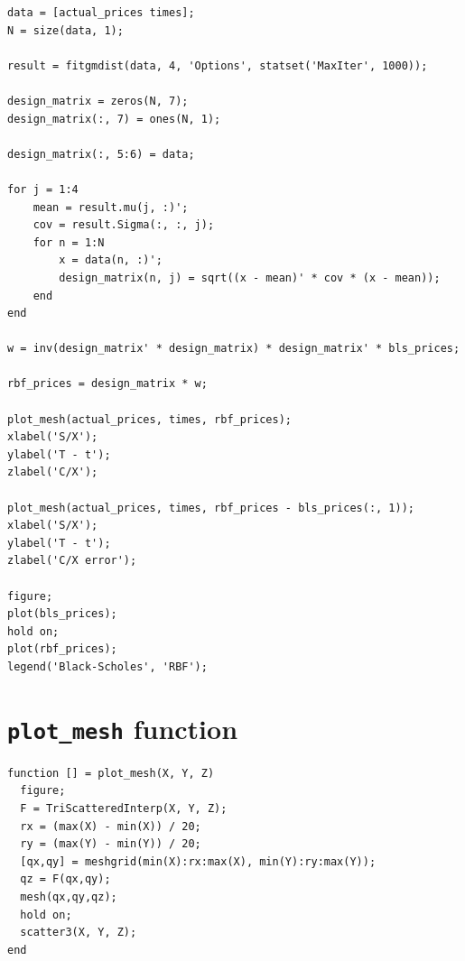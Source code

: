 \documentclass[12pt]{article}
\begin{document}
\begin{verbatim}
data = [actual_prices times];
N = size(data, 1);

result = fitgmdist(data, 4, 'Options', statset('MaxIter', 1000));

design_matrix = zeros(N, 7);
design_matrix(:, 7) = ones(N, 1);

design_matrix(:, 5:6) = data;

for j = 1:4
    mean = result.mu(j, :)';
    cov = result.Sigma(:, :, j);
    for n = 1:N
        x = data(n, :)';
        design_matrix(n, j) = sqrt((x - mean)' * cov * (x - mean));
    end
end

w = inv(design_matrix' * design_matrix) * design_matrix' * bls_prices;

rbf_prices = design_matrix * w;

plot_mesh(actual_prices, times, rbf_prices);
xlabel('S/X');
ylabel('T - t');
zlabel('C/X');

plot_mesh(actual_prices, times, rbf_prices - bls_prices(:, 1));
xlabel('S/X');
ylabel('T - t');
zlabel('C/X error');

figure;
plot(bls_prices);
hold on;
plot(rbf_prices);
legend('Black-Scholes', 'RBF');
  \end{verbatim}

  \section{\texttt{plot\_mesh} function}

  \begin{verbatim}
function [] = plot_mesh(X, Y, Z)
  figure;
  F = TriScatteredInterp(X, Y, Z);
  rx = (max(X) - min(X)) / 20;
  ry = (max(Y) - min(Y)) / 20;
  [qx,qy] = meshgrid(min(X):rx:max(X), min(Y):ry:max(Y));
  qz = F(qx,qy);
  mesh(qx,qy,qz);
  hold on;
  scatter3(X, Y, Z);
end
  \end{verbatim}
\end{document}
